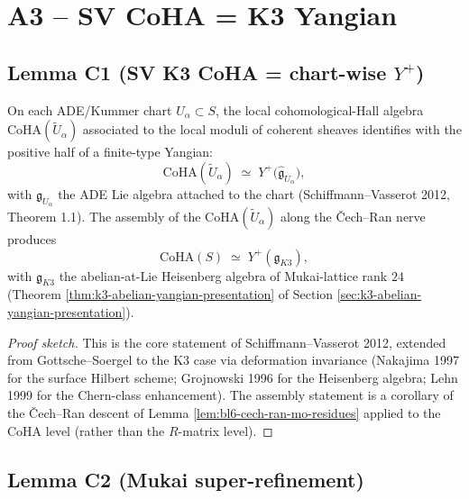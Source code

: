 \section*{A3 -- SV CoHA = K3 Yangian}

\subsection*{Lemma C1 (SV K3 CoHA = chart-wise $Y^{+}$)}

\begin{lemma}
\label{lem:bl6-sv-chart-kang-yangian}
On each ADE/Kummer chart $U_{\alpha} \subset S$, the local
cohomological-Hall algebra
$\mathrm{CoHA}(\widetilde U_{\alpha})$ associated to the local
moduli of coherent sheaves identifies with the positive half of a
finite-type Yangian:
\[
   \mathrm{CoHA}(\widetilde U_{\alpha})
     \;\simeq\;
   Y^{+}\bigl(\widehat{\mathfrak g}_{U_{\alpha}}\bigr),
\]
with $\mathfrak g_{U_{\alpha}}$ the ADE Lie algebra attached to the
chart (Schiffmann--Vasserot 2012, Theorem 1.1).  The assembly of
the $\mathrm{CoHA}(\widetilde U_{\alpha})$ along the \v Cech--Ran
nerve produces
\[
   \mathrm{CoHA}(S)
     \;\simeq\;
   Y^{+}(\mathfrak g_{K3}),
\]
with $\mathfrak g_{K3}$ the abelian-at-Lie Heisenberg algebra of
Mukai-lattice rank $24$ (Theorem
\ref{thm:k3-abelian-yangian-presentation} of Section
\ref{sec:k3-abelian-yangian-presentation}).
\end{lemma}

\begin{proof}[Proof sketch]
This is the core statement of Schiffmann--Vasserot 2012, extended
from Gottsche--Soergel to the K3 case via deformation invariance
(Nakajima 1997 for the surface Hilbert scheme; Grojnowski 1996 for
the Heisenberg algebra; Lehn 1999 for the Chern-class enhancement).
The assembly statement is a corollary of the \v Cech--Ran descent
of Lemma \ref{lem:bl6-cech-ran-mo-residues} applied to the CoHA
level (rather than the $R$-matrix level).
\end{proof}

\subsection*{Lemma C2 (Mukai super-refinement)}

